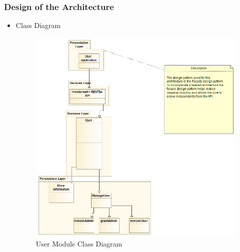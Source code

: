 \documentclass{article}
\begin{document}
	\subsubsection{Design of the Architecture}
		\begin{itemize}
 				\item Class Diagram
 				\begin{center}
					\begin{figure}[!h]
					\includegraphics[scale=0.5]{cdu.png}
					\caption{User Module Class Diagram}
					\end{figure}
				\end{center}
	 			\clearpage
	 			

\end{itemize}
\end{document}
